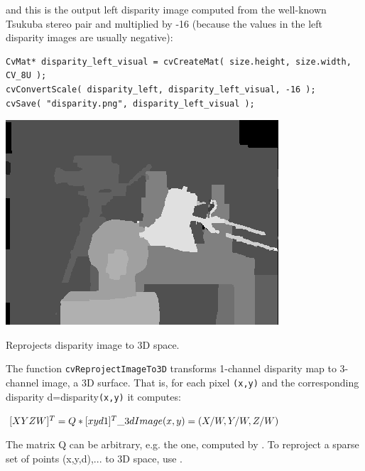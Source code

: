 and this is the output left disparity image computed from the well-known Tsukuba stereo pair and multiplied by -16 (because the values in the left disparity images are usually negative): 

\begin{lstlisting}
CvMat* disparity_left_visual = cvCreateMat( size.height, size.width, CV_8U );
cvConvertScale( disparity_left, disparity_left_visual, -16 );
cvSave( "disparity.png", disparity_left_visual );
\end{lstlisting}

\includegraphics{pics/disparity.png}


Reprojects disparity image to 3D space.


\begin{description}
\end{description}

The function \texttt{cvReprojectImageTo3D} transforms 1-channel disparity map to 3-channel image, a 3D surface. That is, for each pixel \texttt{(x,y)} and the corresponding disparity d=disparity\texttt{(x,y)} it computes: 

$[X Y Z W]^T = Q*[x y d 1]^T
\newline
\_3dImage(x,y) = (X/W, Y/W, Z/W)$

The matrix Q can be arbitrary, e.g. the one, computed by . To reproject a sparse set of points {(x,y,d),...} to 3D space, use . 

